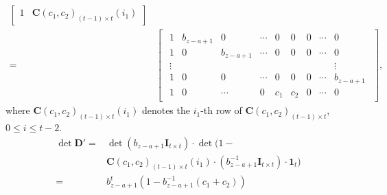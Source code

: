 \documentclass[journal,twocolumn]{IEEEtran}
\theoremstyle{definition}
\newcommand{\bfI}{\mathbf{I}}
\newcommand{\bfC}{\mathbf{C}}
\newcommand{\bfD}{\mathbf{D}}
\newcommand{\bfoe}{\mathbf{1}}
\begin{document}
\begin{itemize}
\begin{align*}
\begin{bmatrix}
			1&\bfC(c_1, c_2)_{(t-1)\times t}(i_1)
		\end{bmatrix}\\=&
		\begin{bmatrix}
		\begin{smallmatrix}
			1&b_{z-a+1}&0&\cdots&0&0&0&\cdots&0\\
			1&0&b_{z-a+1}&\cdots&0&0&0&\cdots&0\\
			\vdots&&&&&&&&\vdots\\
			1&0&0&\cdots&0&0&0&\cdots&b_{z-a+1}\\
			1&0&\cdots&0&c_1&c_2&0&\cdots&0
			\end{smallmatrix}
		\end{bmatrix},
	\end{align*}
	where $\bfC(c_1, c_2)_{(t-1)\times t}(i_1)$ denotes the $i_1$-th row of $\bfC(c_1, c_2)_{(t-1)\times t}$, $0\le i\le t-2$.
	\begin{align*}
	\det \bfD'=&\det (b_{z-a+1}\bfI_{t\times t})\cdot \det(1-\\
	&\bfC(c_1,c_2)_{(t-1)\times t}(i_1)\cdot(b^{-1}_{z-a+1}\bfI_{t\times t})\cdot\bfoe_t)\\
	=&b_{z-a+1}^t(1-b_{z-a+1}^{-1}(c_1+c_2))
	\end{align*}
	

\end{itemize}
\end{document}
